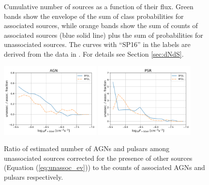\begin{figure}[h]
\caption{Cumulative number of sources as a function of their flux. Green bands show the envelope of the sum of class probabilities for associated sources, while orange bands show the sum of counts of associated sources (blue solid line) plus the sum of probabilities for unassociated sources. The curves with ``SP16'' in the labels are derived from the data in \cite{2016ApJ...820....8S}. For details see Section \ref{sec:dNdS}.}  
\label{fig:logN_logS}
\end{figure}


\begin{figure}[h]
\center
\includegraphics[width=0.45\textwidth]{plots/N_logS_diff_AGN.pdf}
\includegraphics[width=0.45\textwidth]{plots/N_logS_diff_PSR.pdf}
\caption{Ratio of estimated number of AGNs and pulsars among unassociated sources corrected for the presence of other sources (Equation (\ref{eq:unassoc_ev})) to the counts of associated AGNs and pulsars respectively.}  
\label{fig:unass_vs_ass_frac}
\end{figure}




